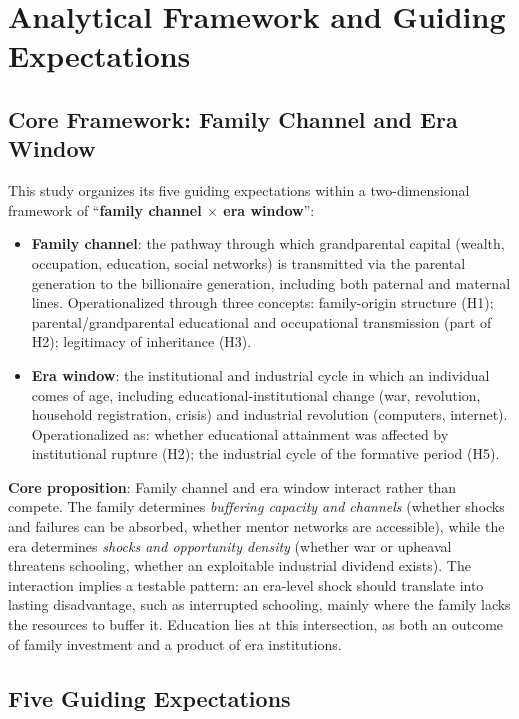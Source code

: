 \documentclass[11pt,a4paper]{article}
\begin{document}
\section{Analytical Framework and Guiding Expectations}
\label{sec:theory}

\subsection{Core Framework: Family Channel and Era Window}

This study organizes its five guiding expectations within a two-dimensional framework of ``\textbf{family channel $\times$ era window}'':

\begin{itemize}
\item \textbf{Family channel}: the pathway through which grandparental capital (wealth, occupation, education, social networks) is transmitted via the parental generation to the billionaire generation, including both paternal and maternal lines. Operationalized through three concepts: family-origin structure (H1); parental/grandparental educational and occupational transmission (part of H2); legitimacy of inheritance (H3).
\item \textbf{Era window}: the institutional and industrial cycle in which an individual comes of age, including educational-institutional change (war, revolution, household registration, crisis) and industrial revolution (computers, internet). Operationalized as: whether educational attainment was affected by institutional rupture (H2); the industrial cycle of the formative period (H5).
\end{itemize}

\textbf{Core proposition}: Family channel and era window interact rather than compete. The family determines \emph{buffering capacity and channels} (whether shocks and failures can be absorbed, whether mentor networks are accessible), while the era determines \emph{shocks and opportunity density} (whether war or upheaval threatens schooling, whether an exploitable industrial dividend exists). The interaction implies a testable pattern: an era-level shock should translate into lasting disadvantage, such as interrupted schooling, mainly where the family lacks the resources to buffer it. Education lies at this intersection, as both an outcome of family investment and a product of era institutions.

\subsection{Five Guiding Expectations}
\end{document}
